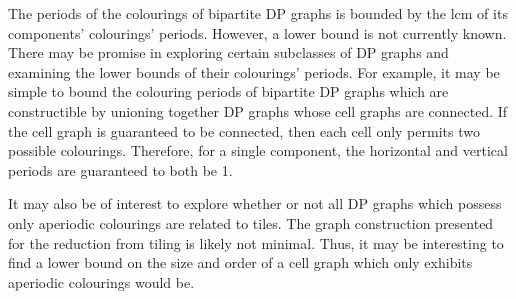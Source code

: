 \documentclass[letterpaper]{article}
\begin{document}
The periods of the colourings of bipartite DP graphs is bounded by the lcm of its components' colourings' periods.
However, a lower bound is not currently known.
There may be promise in exploring certain subclasses of DP graphs and examining the lower bounds of their colourings' periods.
For example, it may be simple to bound the colouring periods of bipartite DP graphs which are constructible by unioning together DP graphs whose cell graphs are connected.
If the cell graph is guaranteed to be connected, then each cell only permits two possible colourings.
Therefore, for a single component, the horizontal and vertical periods are guaranteed to both be 1.

It may also be of interest to explore whether or not all DP graphs which possess only aperiodic colourings are related to tiles.
The graph construction presented for the reduction from tiling is likely not minimal.
Thus, it may be interesting to find a lower bound on the size and order of a cell graph which only exhibits aperiodic colourings would be.


\end{document}
